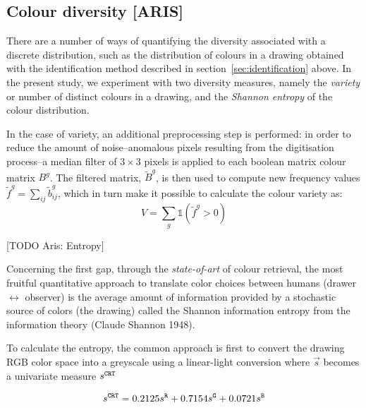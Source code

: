\documentclass[11pt,a4paper]{article}
\begin{document}
\subsection{Colour diversity [ARIS]}
\label{sec:diversity}

There are a number of ways of quantifying the diversity associated with
a discrete distribution, such as the distribution of colours in a drawing
obtained with the identification method described in section~\ref{sec:identification}
above. In the present study, we experiment with two diversity measures,
namely the {\em variety} or number of distinct colours in a drawing, and the
{\em Shannon entropy} of the colour distribution.

In the case of variety, an additional preprocessing step is performed: in order
to reduce the amount of noise--anomalous pixels resulting from the
digitisation process--a median filter of \(3 \times 3\) pixels is applied to each 
boolean matrix colour matrix $B^{g}$. The filtered matrix, $\tilde{B}^{g}$, is 
then used to compute new frequency values $\tilde{f}^{g} = 
\sum_{ij}\tilde{b}_{ij}^{g}$, which in turn make it possible to calculate the colour 
variety as:
\begin{equation}
	V = \sum_{g}\mathds{1}(\tilde{f}^{g} > 0)
\end{equation}

[TODO Aris: Entropy] 


Concerning the first gap, through the \emph{state-of-art} of colour
retrieval, the most fruitful quantitative approach to translate color
choices between humans (drawer \(\leftrightarrow\) observer) is the
average amount of information provided by a stochastic source of colors
(the drawing) called the Shannon information entropy from the
information theory (Claude Shannon 1948).

To calculate the entropy, the common approach is first to convert the
drawing RGB color space into a greyscale using a linear-light conversion
where \(\vec{s}\) becomes a univariate measure \(s^{\tt \tiny CRT}\)

\[s^{\tt \scriptstyle CRT} = 0.2125s^{\tt \scriptstyle R} + 0.7154 s^{\tt \scriptstyle G}+ 0.0721 s^{\tt \scriptstyle B}\]
\end{document}
